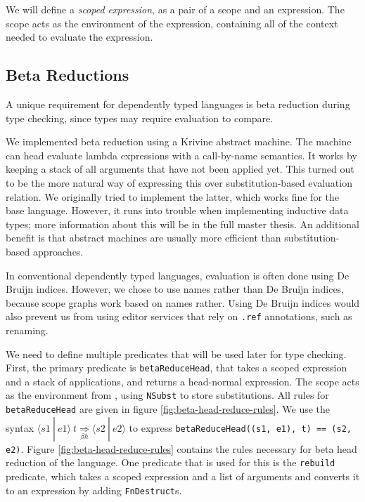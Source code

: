 \documentclass[a4paper,UKenglish,cleveref, autoref, thm-restate]{oasics-v2021}
\newcommand{\scope}[2]{\langle#1 \: | \: #2\rangle}
\newcommand{\bhr}[3]{ #1 \: #2 \underset{\beta h}{\Rightarrow} #3 }
\begin{document}
We will define a \emph{scoped expression}, as a pair of a scope and an expression. The scope acts as the environment of the expression, containing all of the context needed to evaluate the expression. 

\subsection{Beta Reductions}
\label{sec:coc-dynsyms}

A unique requirement for dependently typed languages is beta reduction during type checking, since types may require evaluation to compare.

We implemented beta reduction using a Krivine abstract machine\cite{krivine}. The machine can head evaluate lambda expressions with a call-by-name semantics. It works by keeping a stack of all arguments that have not been applied yet. This turned out to be the more natural way of expressing this over substitution-based evaluation relation. We originally tried to implement the latter, which works fine for the base language. However, it runs into trouble when implementing inductive data types; more information about this will be in the full master thesis. An additional benefit is that abstract machines are usually more efficient than substitution-based approaches.

In conventional dependently typed languages, evaluation is often done using De Bruijn indices. However, we chose to use names rather than De Bruijn indices, because scope graphs work based on names rather. Using De Bruijn indices would also prevent us from using editor services that rely on \verb|.ref| annotations, such as renaming.

We need to define multiple predicates that will be used later for type checking. First, the primary predicate is \verb|betaReduceHead|, that takes a scoped expression and a stack of applications, and returns a head-normal expression. The scope acts as the environment from \cite{krivine}, using \verb|NSubst| to store substitutions. All rules for \verb|betaReduceHead| are given in figure \ref{fig:beta-head-reduce-rules}. We use the syntax $\bhr{\scope{s1}{e1}}{t}{\scope{s2}{e2}}$ to express \verb|betaReduceHead((s1, e1), t) == (s2, e2)|. Figure \ref{fig:beta-head-reduce-rules} contains the rules necessary for beta head reduction of the language. One predicate that is used for this is the \verb|rebuild| predicate, which takes a scoped expression and a list of arguments and converts it to an expression by adding \verb|FnDestruct|s.
\end{document}
